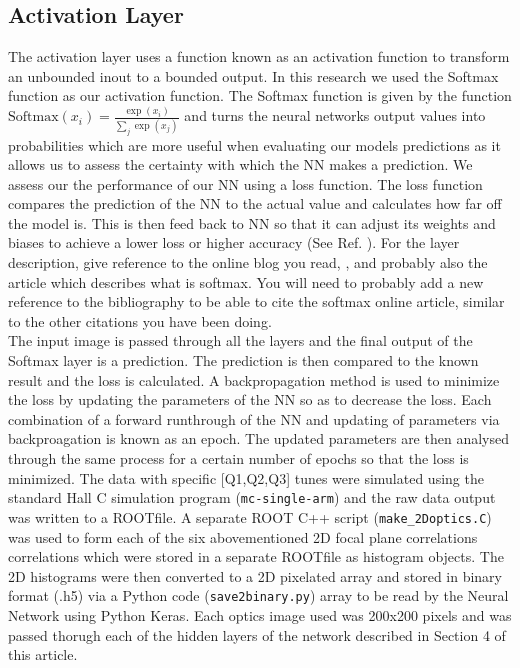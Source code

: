 \documentclass[conference]{IEEEtran}
\begin{document}
\subsection{Activation Layer}
The activation layer uses a function known as an activation function to transform an unbounded inout to a bounded output. In this research we used the Softmax function as our activation function. The Softmax function is given by the function $\text{Softmax}(x_{i}) = \frac{\exp(x_i)}{\sum_j \exp(x_j)}$ and turns the neural networks output values into probabilities which are more useful when evaluating our models predictions as it allows us to assess the certainty with which the NN makes a prediction. We assess our the performance of our NN using a loss function. The loss function compares the prediction of the NN to the actual value and calculates how far off the model is. This is then feed back to NN so that it can adjust its weights and biases to achieve a lower loss or higher accuracy (See Ref. \cite{}). For the layer description, give reference to the online blog you read, \cite{CNNPart1_VZ_2019}, and probably also
the article which describes what is softmax. You will need to probably add a new reference to the bibliography to be able to cite the softmax online article, similar to the other citations you have been doing.\\

The input image is passed through all the layers and the final output of the Softmax layer is a prediction. The prediction is then compared to the known result and the loss is calculated. A backpropagation method is used to minimize the loss by updating the parameters of the NN so as to decrease the loss. Each combination of a forward runthrough of  the NN and updating of parameters via backproagation is known as an epoch. The updated parameters are then analysed through the same process for a certain number of epochs so that the loss is minimized.
\indent The data with specific [Q1,Q2,Q3] tunes were simulated using the standard Hall C simulation program (\texttt{mc-single-arm})
and the raw data output was written to a ROOTfile. A separate ROOT C++ script (\texttt{make\_2Doptics.C}) was used to form each of
the six abovementioned 2D focal plane correlations correlations which were stored in a separate ROOTfile as histogram objects.
The 2D histograms were then converted to a 2D pixelated array and stored in binary format (.h5) via a Python code (\texttt{save2binary.py})
array to be read by the Neural Network using Python Keras. Each optics image used was 200x200 pixels and was passed thorugh each of
the hidden layers of the network described in Section 4 of this article.
\end{document}
